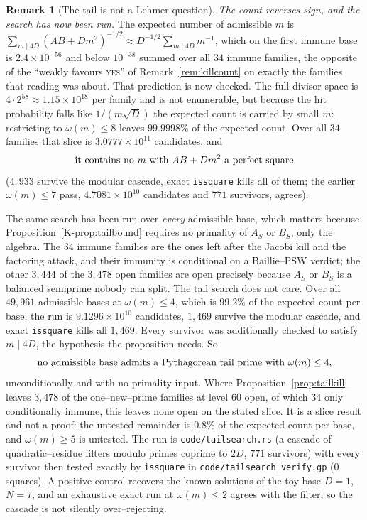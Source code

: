 \documentclass[11pt]{article}
\theoremstyle{definition}
\newtheorem{remark}[theorem]{Remark}
\begin{document}
\begin{remark}[The tail is not a Lehmer question]
\emph{The count reverses sign, and the search has now been run.} The expected number of admissible
$m$ is $\sum_{m\mid 4D}(AB+Dm^2)^{-1/2}\approx D^{-1/2}\sum_{m\mid4D}m^{-1}$, which on the first
immune base is $2.4\times10^{-56}$ and below $10^{-38}$ summed over all $34$ immune families, the
opposite of the ``weakly favours \textsc{yes}'' of Remark~\ref{rem:killcount} on exactly the families
that reading was about. That prediction is now checked. The full divisor space is
$4\cdot2^{58}\approx1.15\times10^{18}$ per family and is not enumerable, but because the hit
probability falls like $1/(m\sqrt D)$ the expected count is carried by small $m$: restricting to
$\omega(m)\le8$ leaves $99.9998\%$ of the expected count. Over all $34$ families that slice is
$3.0777\times10^{11}$ candidates, and
\[ \textup{it contains no }m\textup{ with }AB+Dm^2\textup{ a perfect square} \]
($4{,}933$ survive the modular cascade, exact \texttt{issquare} kills all of them; the earlier
$\omega(m)\le7$ pass, $4.7081\times10^{10}$ candidates and $771$ survivors, agrees).

The same search has been run over \emph{every} admissible base, which matters because
Proposition~\ref{K-prop:tailbound} requires no primality of $A_S$ or $B_S$, only the algebra. The $34$
immune families are the ones left after the Jacobi kill and the factoring attack, and their immunity
is conditional on a Baillie--PSW verdict; the other $3{,}444$ of the $3{,}478$ open families are open
precisely because $A_S$ or $B_S$ is a balanced semiprime nobody can split. The tail search does not
care. Over all $49{,}961$ admissible bases at $\omega(m)\le4$, which is $99.2\%$ of the expected count
per base, the run is $9.1296\times10^{10}$ candidates, $1{,}469$ survive the modular cascade, and
exact \texttt{issquare} kills all $1{,}469$. Every survivor was additionally checked to satisfy
$m\mid 4D$, the hypothesis the proposition needs. So
\[ \textup{no admissible base admits a Pythagorean tail prime with }\omega(m)\le4, \]
unconditionally and with no primality input. Where Proposition~\ref{prop:tailkill} leaves $3{,}478$
of the one--new--prime families at level $60$ open, of which $34$ only conditionally immune, this
leaves none open on the stated slice. It is a slice result and not a proof: the untested remainder is
$0.8\%$ of the expected count per base, and $\omega(m)\ge5$ is untested.
The run is \texttt{code/tailsearch.rs} (a cascade of quadratic--residue filters modulo primes coprime
to $2D$, $771$ survivors) with every survivor then tested exactly by \texttt{issquare} in
\texttt{code/tailsearch\_verify.gp} ($0$ squares). A positive control recovers the known solutions of
the toy base $D=1$, $N=7$, and an exhaustive exact run at $\omega(m)\le2$ agrees with the filter, so
the cascade is not silently over--rejecting.


\end{remark}
\end{document}
